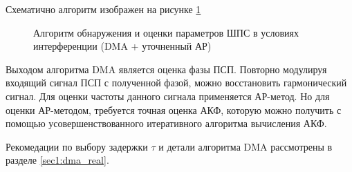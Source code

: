 Схематично алгоритм изображен на рисунке \ref{pic4:dma_quadruple_lpc}

\begin{figure}[H]
\center{}
	\caption{Алгоритм обнаружения и оценки параметров ШПС в условиях интерференции (DMA + уточненный АР)}
	\label{pic4:dma_quadruple_lpc}
\end{figure}

Выходом алгоритма DMA является оценка фазы ПСП. Повторно модулируя входящий сигнал ПСП с полученной
фазой, можно восстановить гармонический сигнал. Для оценки частоты данного сигнала применяется
АР-метод. Но для оценки АР-методом, требуется точная оценка АКФ, которую можно получить
с помощью усовершенствованного итеративного алгоритма вычисления АКФ.

Рекомедации по выбору задержки ${\tau}$ и детали алгоритма DMA рассмотрены в разделе
\ref{sec1:dma_real}.

